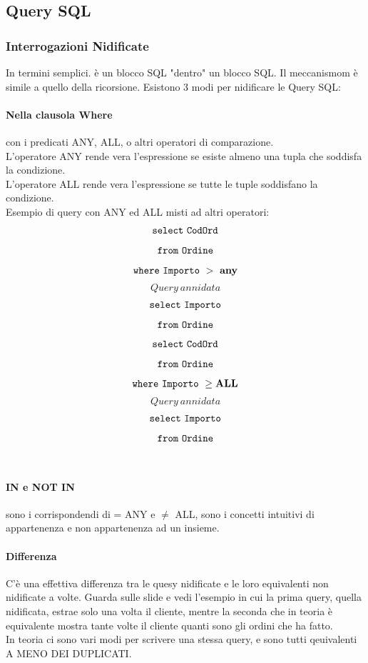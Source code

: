 \documentclass[11pt]{article} %
\begin{document}
\subsection{Query SQL}
\subsubsection{Interrogazioni Nidificate}
In termini semplici. è un blocco SQL "dentro" un blocco SQL. Il meccanismom è simile a quello della ricorsione. Esistono 3 modi per nidificare le Query SQL:\\
\paragraph{Nella clausola Where} con i predicati ANY, ALL, o altri operatori di comparazione.\\
L'operatore ANY rende vera l'espressione se esiste almeno una tupla che soddisfa la condizione.\\
L'operatore ALL rende vera l'espressione se tutte le tuple soddisfano la condizione.\\
Esempio di query con ANY ed ALL misti ad altri operatori:
$$ \tt select\ CodOrd $$ $$ \tt from\ Ordine $$ $$ \tt where\ Importo\ \bf >\ any \tt $$ $$ Query\ annidata $$ $$ \tt select\ Importo $$ $$ \tt from\ Ordine $$ \newpage
$$ \tt select\ CodOrd $$ $$ \tt from\ Ordine $$ $$ \tt where\ Importo\ \bf \ge ALL \tt $$ $$ Query\ annidata $$ $$ \tt select\ Importo $$ $$ \tt from\ Ordine $$\\
\paragraph{IN e NOT IN} sono i corrispondendi di = ANY e $\ne$ ALL, sono i concetti intuitivi di appartenenza e non appartenenza ad un insieme.\\
\paragraph{Differenza}
C'è una effettiva differenza tra le quesy nidificate e le loro equivalenti non nidificate a volte. Guarda sulle slide e vedi l'esempio in cui la prima query, quella nidificata, estrae solo una volta il cliente, mentre la seconda che in teoria è equivalente mostra tante volte il cliente quanti sono gli ordini che ha fatto.\\
In teoria ci sono vari modi per scrivere una stessa query, e sono tutti qeuivalenti A MENO DEI DUPLICATI. 
\end{document}

